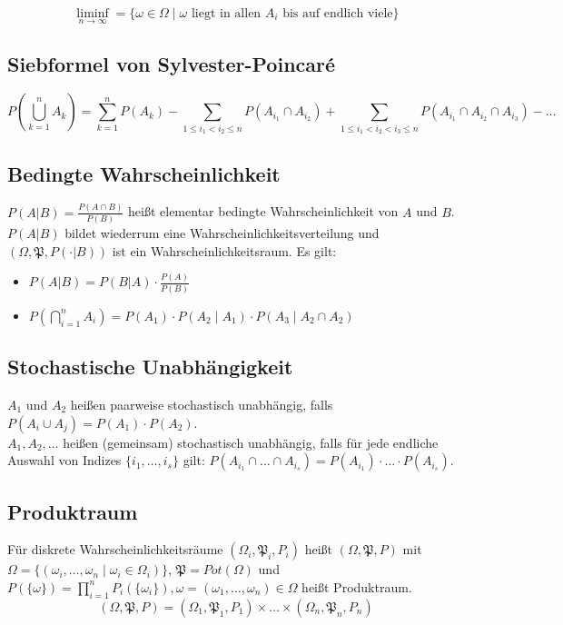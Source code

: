 \documentclass{scrartcl}%
\begin{document}
\[\liminf\limits_{n \rightarrow \infty} = \{\omega \in \Omega \mid \omega \textrm{ liegt in allen } A_i \textrm{ bis auf endlich viele}\}\]

\subsection{Siebformel von Sylvester-Poincaré}
\[P(\bigcup\limits_{k=1}^n A_k) = {\sum\limits_{k=1}^n P(A_k)} - \sum\limits_{1 \leq i_1 < i_2 \leq n} P(A_{i_1} \cap A_{i_2}) + \sum\limits_{1 \leq i_1 < i_2 < i_3 \leq n} P(A_{i_1} \cap A_{i_2} \cap A_{i_3}) - \ldots\]

\subsection{Bedingte Wahrscheinlichkeit}
$P(A\vert B) = \frac{P (A \cap B)}{P(B)}$ heißt elementar bedingte Wahrscheinlichkeit von $A$ und $B$. $P(A\vert B)$ bildet wiederrum eine Wahrscheinlichkeitsverteilung und $(\Omega, \mathfrak{P}, P(\cdot\vert B))$ ist ein Wahrscheinlichkeitsraum. Es gilt:

\begin{itemize}
	\item{$P(A\vert B) = P(B\vert A) \cdot \frac{P(A)}{P(B)}$}
	\item{$P(\bigcap\limits_{i=1}^n A_i) = P(A_1) \cdot P(A_2\mid A_1) \cdot P(A_3\mid A_2 \cap A_2)$}
\end{itemize}

\subsection{Stochastische Unabhängigkeit}
$A_1$ und $A_2$ heißen paarweise stochastisch unabhängig, falls $P(A_i \cup A_j) = P(A_1) \cdot P(A_2)$.\\
$A_1, A_2, \ldots$ heißen (gemeinsam) stochastisch unabhängig, falls für jede endliche Auswahl von Indizes $\{i_1, \ldots, i_s\}$ gilt: $P(A_{i_1} \cap \ldots \cap A_{i_s}) = P(A_{i_1}) \cdot \ldots \cdot P(A_{i_s})$.

\subsection{Produktraum}
Für diskrete Wahrscheinlichkeitsräume $(\Omega_i, \mathfrak{P}_i, P_i)$ heißt $(\Omega, \mathfrak{P}, P)$ mit $\Omega = \{(\omega_i, \ldots, \omega_n \mid \omega_i \in \Omega_i)\}$, $\mathfrak{P} = Pot(\Omega)$ und $P(\{\omega\}) = \prod\limits_{i=1}^n P_i(\{\omega_i\}), \omega = (\omega_1, \ldots,\omega_n) \in \Omega$ heißt Produktraum.
\[(\Omega, \mathfrak{P}, P) = (\Omega_1, \mathfrak{P}_1, P_1) \times \ldots \times (\Omega_n, \mathfrak{P}_n, P_n)\]
\end{document}
